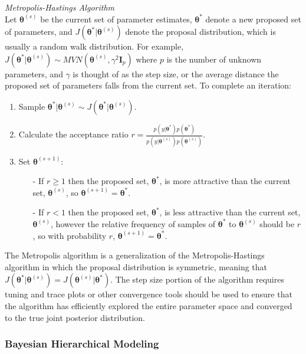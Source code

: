 \documentclass[12pt]{article}\usepackage[]{graphicx}\usepackage[]{color}
\begin{document}
\begin{mdframed}
\textit{Metropolis-Hastings Algorithm} \\
Let $\bm{\theta}^{(s)}$ be the current set of parameter estimates, $\bm{\theta}^*$ denote a new proposed set of parameters, and $J(\bm{\theta}^*|\bm{\theta}^{(s)})$ denote the proposal distribution, which is usually a random walk distribution. For example, $J(\bm{\theta}^*|\bm{\theta}^{(s)}) \sim MVN(\bm{\theta}^{(s)}, \gamma^2 \bm{I}_p)$ where $p$ is the number of unknown parameters, and $\gamma$ is thought of as the step size, or the average distance the proposed set of parameters falls from the current set. To complete an iteration: 
\begin{enumerate}
\item Sample $\bm{\theta}^*|\bm{\theta}^{(s)} \sim J(\bm{\theta}^*|\bm{\theta}^{(s)})$. 
\item Calculate the acceptance ratio $r = \frac{p(y|\bm{\theta}^*)p(\bm{\theta}^*)}{p(y|\bm{\theta}^{(s)})p(\bm{\theta}^{(s)})}$. 
\item Set $\bm{\theta}^{(s+1)}$:
\begin{itemize}
\item[-] If $r \geq 1$ then the proposed set, $\bm{\theta}^*$, is more attractive than the current set, $\bm{\theta}^{(s)}$, so $\bm{\theta}^{(s+1)} =   \bm{\theta}^*$. 
\item[-] If $r < 1$ then the proposed set, $\bm{\theta}^*$, is less attractive than the current set, $\bm{\theta}^{(s)}$, however the relative frequency of samples of $\bm{\theta}^*$ to $\bm{\theta}^{(s)}$ should be $r$, so with probability $r$, $\bm{\theta}^{(s+1)} = \bm{\theta}^*$.
\end{itemize}
\end{enumerate}
\end{mdframed}
  
\noindent The Metropolis algorithm is a generalization of the Metropolis-Hastings algorithm in which the proposal distribution is symmetric, meaning that $J(\bm{\theta}^*|\bm{\theta}^{(s)}) = J(\bm{\theta}^{(s)}|\bm{\theta}^*)$. The step size portion of the algorithm requires tuning and trace plots or other convergence tools should be used to ensure that the algorithm has efficiently explored the entire parameter space and converged to the true joint posterior distribution. 

\subsubsection{Bayesian Hierarchical Modeling}
\end{document}
